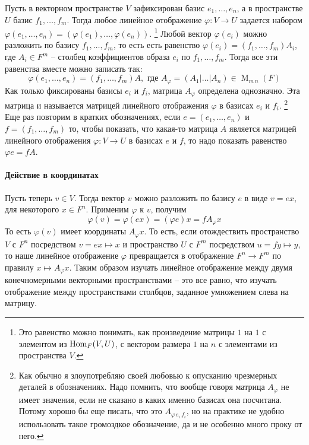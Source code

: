 Пусть в векторном пространстве $V$ зафиксирован базис $e_1,\ldots,e_n$, а в пространстве $U$ базис $f_1,\ldots, f_m$.
Тогда любое линейное отображение $\varphi\colon V\to U$ задается набором $\varphi(e_1,\ldots,e_n) = (\varphi(e_1),\ldots, \varphi(e_n))$.%
\footnote{Это равенство можно понимать, как произведение матрицы $1$ на $1$ с элементом из $\operatorname{Hom}_F(V,U)$, с вектором размера $1$ на $n$ с элементами из пространства $V$.}
Любой вектор $\varphi(e_i)$ можно разложить по базису $f_1,\ldots,f_m$, то есть есть равенство $\varphi(e_i) = (f_1,\ldots,f_m)A_i$, где $A_i\in F^m$ -- столбец коэффициентов образа $e_i$ по $f_1,\ldots,f_m$.
Тогда все эти равенства вместе можно записать так:
\[
\varphi(e_1,\ldots,e_n) = (f_1,\ldots,f_m)A, \text{ где } A_\varphi = (A_1|\ldots|A_n)\in \operatorname{M}_{m\,n}(F)
\]
Как только фиксированы базисы $e_i$ и $f_i$, матрица $A_\varphi$ определена однозначно.
Эта матрица и называется матрицей линейного отображения $\varphi$ в базисах $e_i$ и $f_i$.%
\footnote{Как обычно я злоупотребляю своей любовью к опусканию чрезмерных деталей в обозначениях.
Надо помнить, что вообще говоря матрица $A_\varphi$ не имеет значения, если не сказано в каких именно базисах она посчитана.
Потому хорошо бы еще писать, что это $A_{\varphi\,e_i\,f_i}$, но на практике не удобно использовать такое громоздкое обозначение, да и не особенно много проку от него.}
Еще раз повторим в кратких обозначениях, если $e=(e_1,\ldots,e_n)$ и $f = (f_1,\ldots,f_m)$ то, чтобы показать, что какая-то матрица $A$ является матрицей линейного отображения $\varphi\colon V\to U$ в базисах $e$ и $f$, то надо показать равенство $\varphi e = f A$.

\paragraph{Действие в координатах}

Пусть теперь $v\in V$.
Тогда вектор $v$ можно разложить по базису $e$ в виде $v = ex$, для некоторого $x\in F^n$.
Применим $\varphi$ к $v$, получим
\[
\varphi(v) = \varphi(ex) = (\varphi e)x = f A_\varphi x
\]
То есть $\varphi(v)$ имеет координаты $A_\varphi x$.
То есть, если отождествить пространство $V$ с $F^n$ посредством $v = ex \mapsto x$ и пространство $U$ с $F^m$ посредством $u = fy \mapsto y$, то наше линейное отображение $\varphi$ превращается в отображение $F^n \to F^m$ по правилу $x \mapsto A_\varphi x$.
Таким образом изучать линейное отображение между двумя конечномерными векторными пространствами -- это все равно, что изучать отображение между пространствами столбцов, заданное умножением слева на матрицу.

